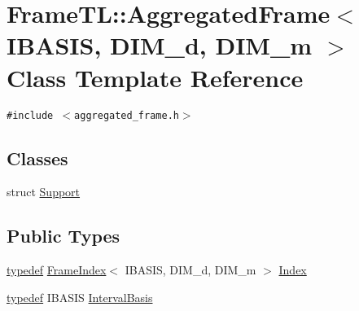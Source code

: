 \hypertarget{classFrameTL_1_1AggregatedFrame}{
\section{FrameTL::AggregatedFrame$<$ IBASIS, DIM\_\-d, DIM\_\-m $>$ Class Template Reference}
\label{classFrameTL_1_1AggregatedFrame}
}
{\tt \#include $<$aggregated\_\-frame.h$>$}

\subsection*{Classes}
\begin{CompactItemize}
\item 
struct \hyperlink{structFrameTL_1_1AggregatedFrame_1_1Support}{Support}
\end{CompactItemize}
\subsection*{Public Types}
\begin{CompactItemize}
\item 
\hyperlink{structtypedef}{typedef} \hyperlink{classFrameTL_1_1FrameIndex}{FrameIndex}$<$ IBASIS, DIM\_\-d, DIM\_\-m $>$ \hyperlink{classFrameTL_1_1AggregatedFrame_62f05cb9f21d52568f720cde28eb124b}{Index}
\item 
\hyperlink{structtypedef}{typedef} IBASIS \hyperlink{classFrameTL_1_1AggregatedFrame_989c4119c49eeea3d42689317393e35a}{IntervalBasis}
\end{CompactItemize}
